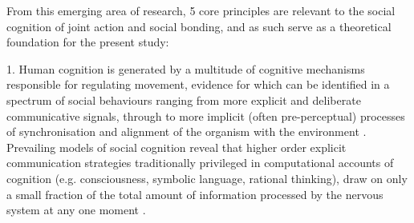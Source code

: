 

From this emerging area of research, 5 core principles are relevant to the social cognition of joint action and social bonding, and as such serve as a theoretical foundation for the present study:

1. Human cognition is generated by a multitude of cognitive mechanisms responsible for regulating movement, evidence for which can be identified in a spectrum of social behaviours ranging from more explicit and deliberate communicative signals, through to more implicit (often pre-perceptual) processes of synchronisation and alignment of the organism with the environment \citep{Frith2010,Semin2008}. Prevailing models of social cognition reveal that higher order explicit communication strategies traditionally privileged in computational accounts of cognition (e.g. consciousness, symbolic language, rational thinking), draw on only a small fraction of the total amount of information processed by the nervous system at any one moment \citep{Semin2012}.

